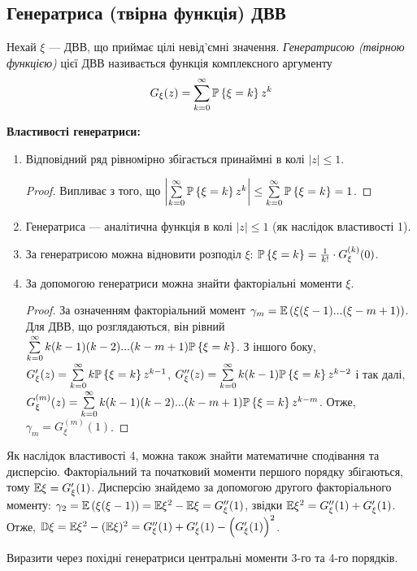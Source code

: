 \subsection{Генератриса (твірна функція) ДВВ}
\begin{definition}
    Нехай $\xi$ --- ДВВ, що приймає цілі невід'ємні значення. 
    \emph{Генератрисою (твірною функцією)} цієї ДВВ називається функція комплексного аргументу
    \begin{equation}\label{eq:gen_func}
        G_\xi(z) = \sum\limits_{k=0}^{\infty} \P\left\{\xi = k\right\} z^k
    \end{equation}
\end{definition}
\noindent \textbf{Властивості генератриси:}
\begin{enumerate}
    \item Відповідний ряд рівномірно збігається принаймні в колі $|z|\leq 1$.
    \begin{proof}
        Випливає з того, що $\left| \sum\limits_{k=0}^{\infty} \P\left\{\xi = k\right\} z^k \right| \leq \sum\limits_{k=0}^{\infty} \P\left\{\xi = k\right\} = 1$.
    \end{proof}
    \item Генератриса --- аналітична функція в колі $|z|\leq 1$ (як наслідок властивості 1).
    \item За генератрисою можна відновити розподіл $\xi$:
    $\P\left\{\xi = k\right\} = \frac{1}{k!}\cdot G_\xi^{(k)}(0)$.
    \item За допомогою генератриси можна знайти факторіальні моменти $\xi$.
    \begin{proof}
        За означенням факторіальний момент $\gamma_m = \E\left( \xi (\xi - 1) ... (\xi - m + 1)\right)$.
        Для ДВВ, що розглядаються, він рівний $\sum\limits_{k=0}^{\infty} k(k-1)(k-2)...(k-m+1) \P\left\{\xi = k\right\}$.
        З іншого боку, $G'_\xi(z) = \sum\limits_{k=0}^{\infty} k \P\left\{\xi = k\right\} z^{k-1}$,
        $G''_\xi(z) = \sum\limits_{k=0}^{\infty} k(k-1) \P\left\{\xi = k\right\} z^{k-2}$ і так далі,
        $G^{(m)}_\xi(z) = \sum\limits_{k=0}^{\infty} k(k-1)(k-2)...(k-m+1) \P\left\{\xi = k\right\} z^{k-m}$.
        Отже, $\gamma_m = G^{(m)}_\xi(1)$.
    \end{proof}
\end{enumerate}
Як наслідок властивості 4, можна також знайти математичне сподівання та дисперсію.
Факторіальний та початковий моменти першого порядку збігаються, тому $\E\xi = G'_\xi(1)$.
Дисперсію знайдемо за допомогою другого факторіального моменту: $\gamma_2 = \E\left( \xi (\xi - 1)\right) = \E\xi^2 - \E\xi = G''_\xi(1)$,
звідки $\E\xi^2 = G''_\xi(1) + G'_\xi(1)$. 
Отже, $\D\xi = \E\xi^2 - (\E\xi)^2 = G''_\xi(1) + G'_\xi(1) - \left( G'_\xi(1)\right)^2$.
\begin{exercise}
    Виразити через похідні генератриси центральні моменти 3-го та 4-го порядків.
\end{exercise}